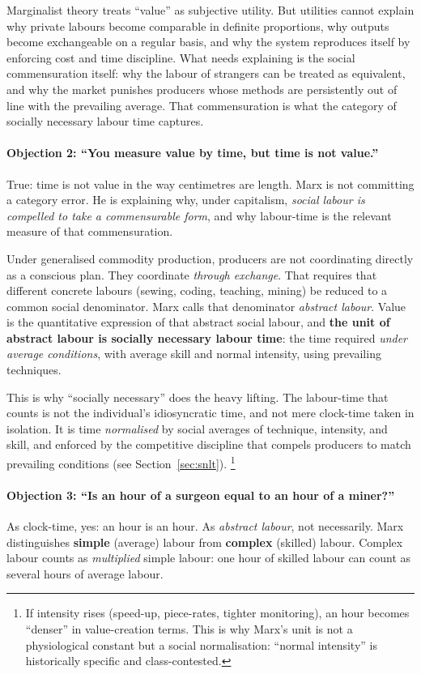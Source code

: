 Marginalist theory treats ``value'' as subjective utility. But utilities cannot explain why private labours become comparable
in definite proportions, why outputs become exchangeable on a regular basis, and why the system reproduces itself by enforcing
cost and time discipline. What needs explaining is the social commensuration itself: why the labour of strangers can be treated
as equivalent, and why the market punishes producers whose methods are persistently out of line with the prevailing average.
That commensuration is what the category of socially necessary labour time captures.\cite{Marx1867}

\paragraph{Objection 2: ``You measure value by time, but time is not value.''}
True: time is not value in the way centimetres are length. Marx is not committing a category error. He is explaining why,
under capitalism, \emph{social labour is compelled to take a commensurable form}, and why labour-time is the relevant measure
of that commensuration.

Under generalised commodity production, producers are not coordinating directly as a conscious plan. They coordinate \emph{through
exchange}. That requires that different concrete labours (sewing, coding, teaching, mining) be reduced to a common social denominator.
Marx calls that denominator \emph{abstract labour}. Value is the quantitative expression of that abstract social labour, and
\textbf{the unit of abstract labour is socially necessary labour time}: the time required \emph{under average conditions}, with average
skill and normal intensity, using prevailing techniques.\cite{Marx1867,Shaikh2016}

This is why ``socially necessary'' does the heavy lifting. The labour-time that counts is not the individual’s idiosyncratic time, and not
mere clock-time taken in isolation. It is time \emph{normalised} by social averages of technique, intensity, and skill, and enforced by the
competitive discipline that compels producers to match prevailing conditions (see Section~\ref{sec:snlt}).%
\footnote{If intensity rises (speed-up, piece-rates, tighter monitoring), an hour becomes ``denser'' in value-creation terms. This is why Marx’s
unit is not a physiological constant but a social normalisation: ``normal intensity'' is historically specific and class-contested.}


\paragraph{Objection 3: ``Is an hour of a surgeon equal to an hour of a miner?''}
As clock-time, yes: an hour is an hour. As \emph{abstract labour}, not necessarily.
Marx distinguishes \textbf{simple} (average) labour from \textbf{complex} (skilled) labour.
Complex labour counts as \emph{multiplied} simple labour: one hour of skilled labour can count as several
hours of average labour.\cite{Marx1867}

